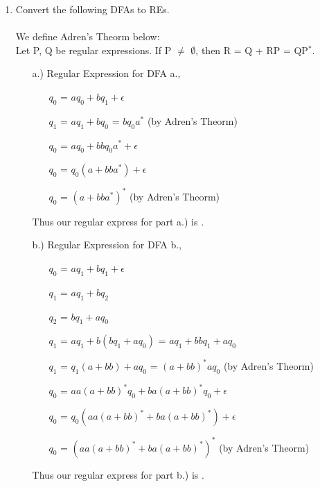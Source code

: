 \documentclass[12pt]{article}
\begin{document}
\begin{enumerate}
\begin{itemize}
\begin{tikzpicture}[shorten >=1pt,node distance=7cm,on grid,auto]
\end{tikzpicture}
	
\end{itemize}
\pagebreak

	\item Convert the following DFAs to REs. \\ \\
	We define Adren's Theorm below: \\
		\tabto{1cm} Let P, Q be regular expressions. If P $\neq$ $\emptyset$, then R = Q + RP = QP$^*$. 	
		\begin{itemize}
			\item[a.)] Regular Expression for DFA a., 
				\begin{itemize}
					\item[] $q_0$ = $aq_0 + bq_1 + \epsilon$
					\item[] $q_1$ = $aq_1 + bq_0$ = $bq_0a^*$ \tabto{9cm} (by Adren's Theorm)
					\item[] $q_0$ = $aq_0 + bbq_0a^* + \epsilon$
					\item[] $q_0$ = $q_0(a+ bba^*) + \epsilon$
					\item[] $q_0$ = $(a+ bba^*)^*$ \tabto{9cm}(by Adren's Theorm)
				\end{itemize}
				Thus our regular express for part a.) is .
				
			\item[b.)] Regular Expression for DFA b., 
				\begin{itemize}
					\item[] $q_0$ = $aq_1 + bq_1 + \epsilon$
					\item[] $q_1$ = $aq_1 + bq_2$ 
					\item[] $q_2$ = $bq_1 + aq_0$ 
					\item[] $q_1$ = $aq_1 + b(bq_1 + aq_0)$ = $aq_1 + bbq_1 + aq_0$
					\item[] $q_1$ = $q_1(a + bb) + aq_0$ = $(a+bb)^*aq_0$ \tabto{9cm} (by Adren's Theorm)
					\item[] $q_0$ = $aa(a+bb)^*q_0 + ba(a+bb)^*q_0 + \epsilon$
					\item[] $q_0$ = $q_0(aa(a+bb)^* + ba(a+bb)^*) + \epsilon$
					\item[] $q_0$ = $(aa(a+bb)^* + ba(a+bb)^*)^*$ \tabto{9cm} (by Adren's Theorm)
				\end{itemize}
				Thus our regular express for part b.) is .
		\end{itemize}

\end{enumerate}
\end{document}
